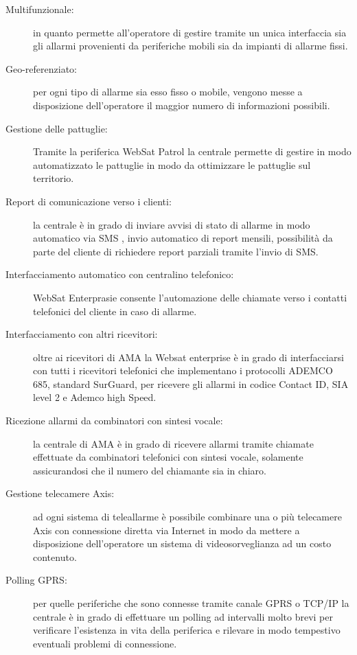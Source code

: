 \begin{description}
	\item [Multifunzionale:] in quanto permette all'operatore di gestire tramite un unica interfaccia sia gli allarmi provenienti da periferiche mobili sia da impianti di allarme fissi.
	\item [Geo-referenziato:] per ogni tipo di allarme sia esso fisso o mobile, vengono messe a disposizione dell'operatore il maggior numero di informazioni possibili.
	\item [Gestione delle pattuglie:] Tramite la periferica WebSat Patrol la centrale permette di gestire in modo automatizzato le pattuglie in modo da ottimizzare le pattuglie sul territorio.
	\item[Report di comunicazione verso i clienti:] la centrale è in grado di inviare avvisi di stato di allarme in modo automatico via SMS , invio automatico di report mensili, possibilità da parte del cliente di richiedere report parziali tramite l'invio di SMS.
	\item [Interfacciamento automatico con centralino telefonico:] WebSat Enterprasie consente l'automazione delle chiamate verso i contatti telefonici del cliente in caso di allarme.
	\item[Interfacciamento con altri ricevitori:] oltre ai ricevitori di AMA la Websat enterprise è in grado di interfacciarsi con tutti i ricevitori telefonici che implementano i protocolli ADEMCO 685, standard SurGuard, per ricevere gli allarmi in codice Contact ID, SIA level 2 e Ademco high Speed.
	\item [Ricezione allarmi da combinatori con sintesi vocale:] la centrale di AMA è in grado di ricevere allarmi tramite chiamate effettuate da combinatori telefonici con sintesi vocale, solamente assicurandosi che il numero del chiamante sia in chiaro.
	\item [Gestione telecamere Axis:] ad ogni sistema di teleallarme è possibile combinare una o più telecamere Axis con connessione diretta via Internet in modo da mettere a disposizione dell'operatore un sistema di videosorveglianza ad un costo contenuto.
	\item [Polling GPRS:] per quelle periferiche che sono connesse tramite canale GPRS o TCP/IP la centrale è in grado di effettuare un polling ad intervalli molto brevi per verificare l'esistenza in vita della periferica e rilevare in modo tempestivo eventuali problemi di connessione.
\end{description}
